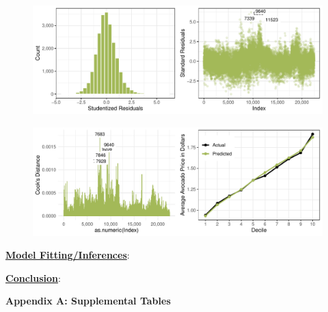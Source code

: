 \documentclass[11pt]{article}\usepackage[]{graphicx}\usepackage[]{color}
\makeatletter
\def\maxwidth{ %
  \ifdim\Gin@nat@width>\linewidth
    \linewidth
  \else
    \Gin@nat@width
  \fi
}
\makeatother
\begin{document}
\begin{figure}[h!] 
\begin{center}

\includegraphics[width=\maxwidth]{figure/unnamed-chunk-5-1} 

\caption{}
\label{explore3}
\end{center} 
\end{figure}


\begin{figure}[h!] 
\begin{center}

\includegraphics[width=\maxwidth]{figure/unnamed-chunk-6-1} 

\caption{}
\label{explore3}
\end{center} 
\end{figure}


\noindent\textbf{\underline{Model Fitting/Inferences}}: 
\hfill \break

\noindent\textbf{\underline{Conclusion}}: 
\hfill \break

\clearpage
\newpage
\noindent \Large{{\bf Appendix A: Supplemental Tables}}
\end{document}
